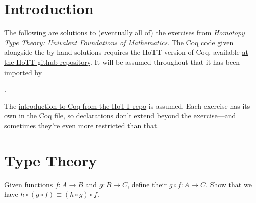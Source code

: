 \begin{coqdoccode}
\end{coqdoccode}
\section*{Introduction}


The following are solutions to (eventually all of) the exercises from
\textit{Homotopy Type Theory: Univalent Foundations of Mathematics}.  The Coq
code given alongside the by-hand solutions requires the HoTT version of Coq,
available \href{https://github.com/HoTT}{at the HoTT github repository}.  It
will be assumed throughout that it has been imported by \begin{coqdoccode}
\coqdocemptyline
\coqdocindent{1.00em}
  .\coqdoceol
\coqdocemptyline
\end{coqdoccode}
The
\href{https://github.com/HoTT/book/blob/master/coq_introduction/Reading_HoTT_in_Coq.v}{introduction
to Coq from the HoTT repo} is assumed.  Each exercise has its own
 in the Coq file, so  declarations don't
extend beyond the exercise---and sometimes they're even more restricted than
that.


\section{Type Theory}




  Given functions $f:A\to B$ and $g:B\to C$, define
their  $g \circ f : A \to C$.  Show that we have $h \circ (g
\circ f) \equiv (h \circ g) \circ f$.


